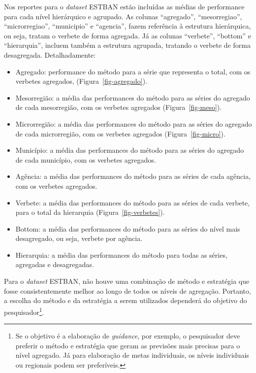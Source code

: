 \documentclass[
  12pt,
  twoside,
  openright,
  a4paper,
  chapter=TITLE,
  section=TITLE,
  brazil]{abntex2}
\providecommand{\tightlist}{%
  \setlength{\itemsep}{0pt}\setlength{\parskip}{0pt}}\usepackage{longtable,booktabs,array}
\begin{document}
Nos reportes para o \emph{dataset} ESTBAN estão incluídas as médias de
performance para cada nível hierárquico e agrupado. As colunas
``agregado'', ``mesorregiao'', ``microrregiao'', ``municipio'' e
``agencia'', fazem referência à estrutura hierárquica, ou seja, tratam o
verbete de forma agregada. Já as colunas ``verbete'', ``bottom'' e
``hierarquia'', incluem também a estrutura agrupada, tratando o verbete
de forma desagregada. Detalhadamente:

\begin{itemize}
\tightlist
\item
  Agregado: performance do método para a série que representa o total,
  com os verbetes agregados, (Figura~\ref{fig-agregado}).
\item
  Mesorregião: a média das performances do método para as séries do
  agregado de cada mesorregião, com os verbetes agregados
  (Figura~\ref{fig-meso}).
\item
  Microrregião: a média das performances do método para as séries do
  agregado de cada microrregião, com os verbetes agregados
  (Figura~\ref{fig-micro}).
\item
  Município: a média das performances do método para as séries do
  agregado de cada município, com os verbetes agregados.
\item
  Agência: a média das performances do método para as séries de cada
  agência, com os verbetes agregados.
\item
  Verbete: a média das performances do método para as séries de cada
  verbete, para o total da hierarquia (Figura~\ref{fig-verbetes}).
\item
  Bottom: a média das performances do método para as séries do nível
  mais desagregado, ou seja, verbete por agência.
\item
  Hierarquia: a média das performances do método para todas as séries,
  agregadas e desagregadas.
\end{itemize}

Para o \emph{dataset} ESTBAN, não houve uma combinação de método e
estratégia que fosse consistentemente melhor ao longo de todos os níveis
de agregação. Portanto, a escolha do método e da estratégia a serem
utilizados dependerá do objetivo do pesquisador\footnote{Se o objetivo é
  a elaboração de \emph{guidance}, por exemplo, o pesquisador deve
  preferir o método e estratégia que geram as previsões mais precisas
  para o nível agregado. Já para elaboração de metas individuais, os
  níveis individuais ou regionais podem ser preferíveis.}.
\end{document}
